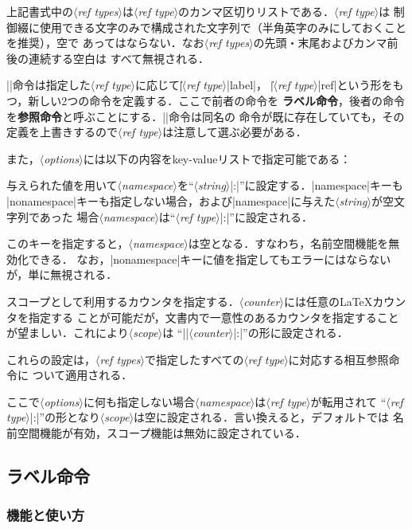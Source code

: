 \documentclass[a4paper,uplatex]{jsarticle}
\newcommand{\Meta}[1]{$\langle$\mbox{}\textit{#1}\mbox{}$\rangle$}
\begin{document}
上記書式中の\Meta{ref types}は\Meta{ref type}のカンマ区切りリストである．\Meta{ref type}は
制御綴に使用できる文字のみで構成された文字列で（半角英字のみにしておくことを推奨），空で
あってはならない．なお\Meta{ref types}の先頭・末尾およびカンマ前後の連続する空白は
すべて無視される．

|\newref|命令は指定した\Meta{ref type}に応じて|\|\Meta{ref type}|label|，
|\|\Meta{ref type}|ref|という形をもつ，新しい2つの命令を定義する．ここで前者の命令を
\textbf{ラベル命令}，後者の命令を\textbf{参照命令}と呼ぶことにする．|\newref|命令は同名の
命令が既に存在していても，その定義を上書きするので\Meta{ref type}は注意して選ぶ必要がある．

また，\Meta{options}には以下の内容をkey-valueリストで指定可能である：
%
\begin{description}[font=\normalfont]
%
\item[|namespace=|\Meta{string}]
与えられた値を用いて\Meta{namespace}を``\Meta{string}|:|''に設定する．|namespace|キーも
|nonamespace|キーも指定しない場合，および|namespace|に与えた\Meta{string}が空文字列であった
場合\Meta{namespace}は``\Meta{ref type}|:|''に設定される．
%
\item[|nonamespace|]
このキーを指定すると，\Meta{namespace}は空となる．すなわち，名前空間機能を無効化できる．
なお，|nonamespace|キーに値を指定してもエラーにはならないが，単に無視される．
%
\item[|scope=|\Meta{counter}]
スコープとして利用するカウンタを指定する．\Meta{counter}には任意の\LaTeX カウンタを指定する
ことが可能だが，文書内で一意性のあるカウンタを指定することが望ましい．これにより\Meta{scope}は
``|\the|\Meta{counter}|:|''の形に設定される．
\end{description}
%
これらの設定は，\Meta{ref types}で指定したすべての\Meta{ref type}に対応する相互参照命令に
ついて適用される．

ここで\Meta{options}に何も指定しない場合\Meta{namespace}は\Meta{ref type}が転用されて
``\Meta{ref type}|:|''の形となり\Meta{scope}は空に設定される．言い換えると，デフォルトでは
名前空間機能が有効，スコープ機能は無効に設定されている．

\subsection{ラベル命令}

\subsubsection{機能と使い方}
\end{document}
